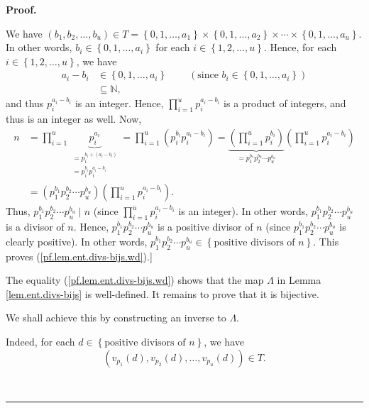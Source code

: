 \documentclass[numbers=enddot,12pt,final,onecolumn,notitlepage]{scrartcl}%
\numberwithin{exer}{subsection}
\theoremstyle{definition}
\newenvironment{fineprint}{\begin{small}}{\end{small}}
\newenvironment{proof}[1][Proof]{\noindent\textbf{#1.} }{\ \rule{0.5em}{0.5em}}
\let\prodnonlimits\prod
\renewcommand{\prod}{\prodnonlimits\limits}
\begin{document}
\begin{proof}
\begin{fineprint}
We have $\left(  b_{1},b_{2},\ldots,b_{u}\right)  \in T=\left\{
0,1,\ldots,a_{1}\right\}  \times\left\{  0,1,\ldots,a_{2}\right\}
\times\cdots\times\left\{  0,1,\ldots,a_{u}\right\}  $. In other words,
$b_{i}\in\left\{  0,1,\ldots,a_{i}\right\}  $ for each $i\in\left\{
1,2,\ldots,u\right\}  $. Hence, for each $i\in\left\{  1,2,\ldots,u\right\}
$, we have%
\begin{align*}
a_{i}-b_{i}  &  \in\left\{  0,1,\ldots,a_{i}\right\}
\ \ \ \ \ \ \ \ \ \ \left(  \text{since }b_{i}\in\left\{  0,1,\ldots
,a_{i}\right\}  \right) \\
&  \subseteq\mathbb{N},
\end{align*}
and thus $p_{i}^{a_{i}-b_{i}}$ is an integer. Hence, $\prod_{i=1}^{u}%
p_{i}^{a_{i}-b_{i}}$ is a product of integers, and thus is an integer as well.
Now,%
\begin{align*}
n  &  =\prod_{i=1}^{u}\underbrace{p_{i}^{a_{i}}}_{\substack{=p_{i}%
^{b_{i}+\left(  a_{i}-b_{i}\right)  }\\=p_{i}^{b_{i}}p_{i}^{a_{i}-b_{i}}%
}}=\prod_{i=1}^{u}\left(  p_{i}^{b_{i}}p_{i}^{a_{i}-b_{i}}\right)
=\underbrace{\left(  \prod_{i=1}^{u}p_{i}^{b_{i}}\right)  }_{=p_{1}^{b_{1}%
}p_{2}^{b_{2}}\cdots p_{u}^{b_{u}}}\left(  \prod_{i=1}^{u}p_{i}^{a_{i}-b_{i}%
}\right) \\
&  =\left(  p_{1}^{b_{1}}p_{2}^{b_{2}}\cdots p_{u}^{b_{u}}\right)  \left(
\prod_{i=1}^{u}p_{i}^{a_{i}-b_{i}}\right)  .
\end{align*}
Thus, $p_{1}^{b_{1}}p_{2}^{b_{2}}\cdots p_{u}^{b_{u}}\mid n$ (since
$\prod_{i=1}^{u}p_{i}^{a_{i}-b_{i}}$ is an integer). In other words,
$p_{1}^{b_{1}}p_{2}^{b_{2}}\cdots p_{u}^{b_{u}}$ is a divisor of $n$. Hence,
$p_{1}^{b_{1}}p_{2}^{b_{2}}\cdots p_{u}^{b_{u}}$ is a positive divisor of $n$
(since $p_{1}^{b_{1}}p_{2}^{b_{2}}\cdots p_{u}^{b_{u}}$ is clearly positive).
In other words, $p_{1}^{b_{1}}p_{2}^{b_{2}}\cdots p_{u}^{b_{u}}\in\left\{
\text{positive divisors of }n\right\}  $. This proves
(\ref{pf.lem.ent.divs-bijs.wd}).]
\end{fineprint}

The equality (\ref{pf.lem.ent.divs-bijs.wd}) shows that the map $\Lambda$ in
Lemma \ref{lem.ent.divs-bijs} is well-defined. It remains to prove that it is bijective.

We shall achieve this by constructing an inverse to $\Lambda$.

Indeed, for each $d\in\left\{  \text{positive divisors of }n\right\}  $, we
have%
\begin{equation}
\left(  v_{p_{1}}\left(  d\right)  ,v_{p_{2}}\left(  d\right)  ,\ldots
,v_{p_{u}}\left(  d\right)  \right)  \in T. \label{pf.lem.ent.divs-bijs.Vwd}%
\end{equation}



\end{proof}
\end{document}
